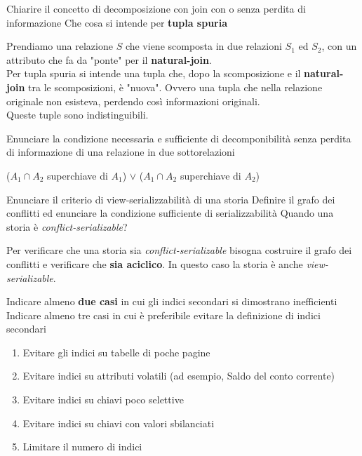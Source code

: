 \documentclass{exam}
\begin{document}
\begin{questions}
\begin{solution}
    \end{solution}
    \question Chiarire il concetto di decomposizione con join con o senza perdita di informazione
    \question Che cosa si intende per \textbf{tupla spuria}
    \begin{solution}
        Prendiamo una relazione $S$ che viene scomposta in due relazioni $S_1$ ed $S_2$, con un attributo che fa da "ponte" per il \textbf{natural-join}.
        \\ 
        Per tupla spuria si intende una tupla che, dopo la scomposizione e il \textbf{natural-join} tra le scomposizioni, è "nuova". Ovvero una tupla che nella relazione 
        originale non esisteva, perdendo così informazioni originali.
        \\
        Queste tuple sono indistinguibili.
    \end{solution}
    \question Enunciare la condizione necessaria e sufficiente di decomponibilità senza perdita di informazione di una relazione in due sottorelazioni
    \begin{solution}
        ($A_1 \cap A_2$ superchiave di $A_1$) $\lor$ ($A_1 \cap A_2$  superchiave di $A_2$) 
    \end{solution}
    \question Enunciare il criterio di view-serializzabilità di una storia
    \question Definire il grafo dei conflitti ed enunciare la condizione sufficiente di serializzabilità
    \question Quando una storia è \textit{conflict-serializable}?
    \begin{solution}
        Per verificare che una storia sia \textit{conflict-serializable} bisogna costruire il grafo dei conflitti e verificare che \textbf{sia aciclico}. In questo caso la storia è anche \textit{view-serializable}.
    \end{solution}
    \question Indicare almeno \textbf{due casi} in cui gli indici secondari si dimostrano inefficienti
    \question Indicare almeno tre casi in cui è preferibile evitare la definizione di indici secondari
    \begin{solution}
        \begin{enumerate}
        \item Evitare gli indici su tabelle di poche pagine  
        \item Evitare indici su attributi volatili (ad esempio, Saldo del conto  corrente)  
        \item Evitare indici su chiavi poco selettive  
        \item Evitare indici su chiavi con valori sbilanciati  
        \item Limitare il numero di indici  

\end{enumerate}
\end{solution}
\end{questions}
\end{document}
